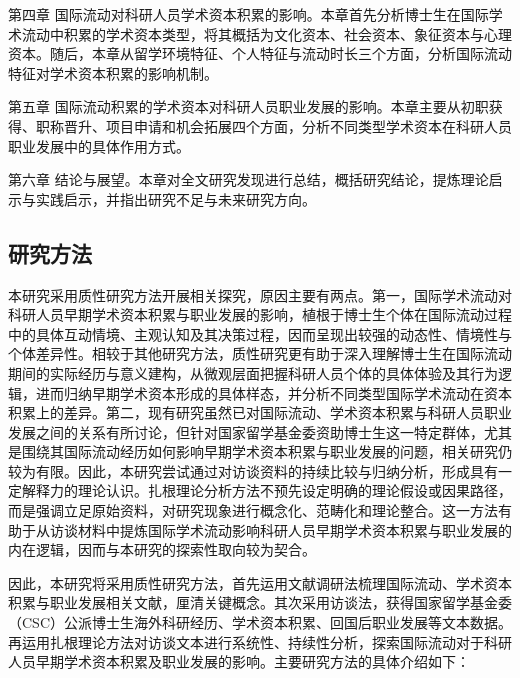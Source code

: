 第四章 国际流动对科研人员学术资本积累的影响。本章首先分析博士生在国际学术流动中积累的学术资本类型，将其概括为文化资本、社会资本、象征资本与心理资本。随后，本章从留学环境特征、个人特征与流动时长三个方面，分析国际流动特征对学术资本积累的影响机制。

第五章 国际流动积累的学术资本对科研人员职业发展的影响。本章主要从初职获得、职称晋升、项目申请和机会拓展四个方面，分析不同类型学术资本在科研人员职业发展中的具体作用方式。

第六章 结论与展望。本章对全文研究发现进行总结，概括研究结论，提炼理论启示与实践启示，并指出研究不足与未来研究方向。


\subsection{研究方法}

本研究采用质性研究方法开展相关探究，原因主要有两点。第一，国际学术流动对科研人员早期学术资本积累与职业发展的影响，植根于博士生个体在国际流动过程中的具体互动情境、主观认知及其决策过程，因而呈现出较强的动态性、情境性与个体差异性。相较于其他研究方法，质性研究更有助于深入理解博士生在国际流动期间的实际经历与意义建构，从微观层面把握科研人员个体的具体体验及其行为逻辑，进而归纳早期学术资本形成的具体样态，并分析不同类型国际学术流动在资本积累上的差异。第二，现有研究虽然已对国际流动、学术资本积累与科研人员职业发展之间的关系有所讨论，但针对国家留学基金委资助博士生这一特定群体，尤其是围绕其国际流动经历如何影响早期学术资本积累与职业发展的问题，相关研究仍较为有限。因此，本研究尝试通过对访谈资料的持续比较与归纳分析，形成具有一定解释力的理论认识。扎根理论分析方法不预先设定明确的理论假设或因果路径，而是强调立足原始资料，对研究现象进行概念化、范畴化和理论整合。这一方法有助于从访谈材料中提炼国际学术流动影响科研人员早期学术资本积累与职业发展的内在逻辑，因而与本研究的探索性取向较为契合。

因此，本研究将采用质性研究方法，首先运用文献调研法梳理国际流动、学术资本积累与职业发展相关文献，厘清关键概念。其次采用访谈法，获得国家留学基金委（CSC）公派博士生海外科研经历、学术资本积累、回国后职业发展等文本数据。再运用扎根理论方法对访谈文本进行系统性、持续性分析，探索国际流动对于科研人员早期学术资本积累及职业发展的影响。主要研究方法的具体介绍如下：

